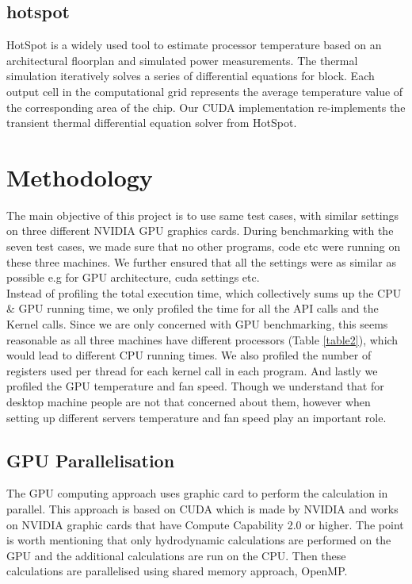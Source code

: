 \documentclass[paper=a4, fontsize=11pt]{scrartcl}
\numberwithin{equation}{section}		%
\numberwithin{figure}{section}			%
\numberwithin{table}{section}				%
\begin{document}
\subsection{hotspot}
HotSpot is a widely used tool to estimate processor temperature based on an architectural floorplan and simulated power measurements. The thermal simulation iteratively solves a series of differential equations for block. Each output cell in the computational grid represents the average temperature value of the corresponding area of the chip. Our CUDA implementation re-implements the transient thermal differential equation solver from HotSpot.






\newpage
\section{Methodology}
The main objective of this project is to use same test cases, with similar settings on three different NVIDIA GPU graphics cards. During benchmarking with the seven test cases, we made sure that no other programs, code etc were running on these three machines. We further ensured that all the settings were as similar as possible e.g for GPU architecture, cuda settings etc.\\


Instead of profiling the total execution time, which collectively sums up the CPU \& GPU running time, we only profiled the time for all the API calls and the Kernel calls. Since we are only concerned with GPU benchmarking, this seems reasonable as all three machines have different processors (Table \ref{table2}), which would lead to different CPU running times. We also profiled the number of registers used per thread for each kernel call in each program. And lastly we profiled the GPU temperature and fan speed. Though we understand that for desktop machine people are not that concerned about them, however when setting up different servers temperature and fan speed play an important role.  

\subsection{GPU Parallelisation}
The GPU computing approach uses graphic card to perform the calculation in parallel. This approach is based on CUDA which is made by NVIDIA and works on NVIDIA graphic cards that have Compute Capability 2.0 or higher. The point is worth mentioning that only hydrodynamic calculations are performed on the GPU and the additional calculations are run on the CPU. Then these calculations are parallelised using shared memory approach, OpenMP.
\end{document}

